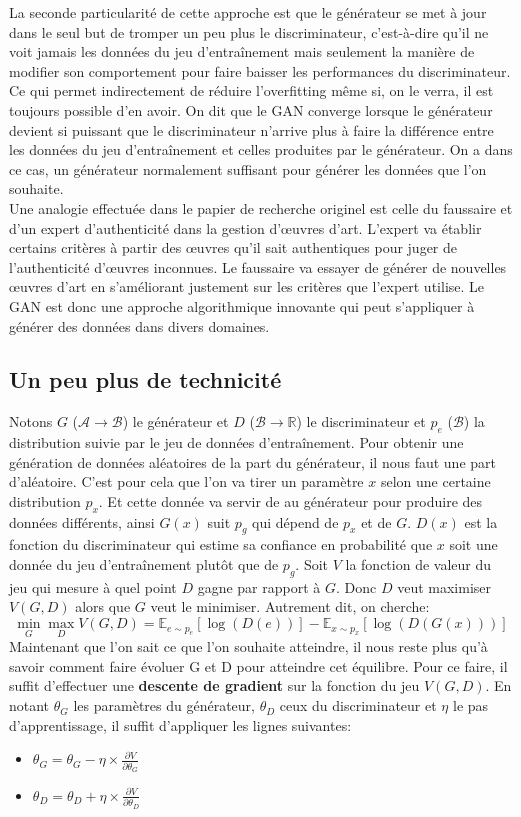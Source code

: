 \documentclass{article}
\begin{document}
La seconde particularité de cette approche est que le générateur se met à jour dans le seul but de tromper un peu
plus le discriminateur, c'est-à-dire qu'il ne voit jamais les données du jeu d'entraînement mais seulement la
manière de modifier son comportement pour faire baisser les performances du discriminateur. Ce qui permet
indirectement de réduire l'overfitting même si, on le verra, il est toujours possible d'en avoir.
On dit que le GAN converge lorsque le générateur devient si puissant que le discriminateur n'arrive plus à faire
la différence entre les données du jeu d'entraînement et celles produites par le générateur. On a dans ce cas, un
générateur normalement suffisant pour générer les données que l'on souhaite. \\

Une analogie effectuée dans le papier de recherche originel est celle du faussaire et d'un expert d'authenticité
dans la gestion d'œuvres d'art. L'expert va établir certains critères à partir des œuvres qu'il sait authentiques
pour juger de l'authenticité d'œuvres inconnues. Le faussaire va essayer de générer de nouvelles œuvres d'art en
s'améliorant justement sur les critères que l'expert utilise.
Le GAN est donc une approche algorithmique innovante qui peut s'appliquer à générer des données dans divers domaines.

\subsection{Un peu plus de technicité}
Notons $G$ ($\mathcal{A} \longrightarrow \mathcal{B}$) le générateur et $D$ ($\mathcal{B} \longrightarrow \mathbb{R}$)
le discriminateur et $p_e$ ($\mathcal{B}$) la distribution suivie par le jeu de données d'entraînement.
Pour obtenir une génération de données aléatoires de la part du générateur, il nous faut une part d'aléatoire. C'est
pour cela que l'on va tirer un paramètre $x$ selon une certaine distribution $p_x$. Et cette donnée va servir de au
générateur pour produire des données différents, ainsi $G(x)$ suit $p_g$ qui dépend de $p_x$ et de $G$.
$D(x)$ est la fonction du discriminateur qui estime sa confiance en probabilité que $x$ soit une donnée du jeu
d'entraînement plutôt que de $p_g$.
Soit $V$ la fonction de valeur du jeu qui mesure à quel point $D$ gagne par rapport à $G$. Donc $D$ veut maximiser
$V(G, D)$ alors que $G$ veut le minimiser.
Autrement dit, on cherche:
$$ \min_G \max_D V(G, D) = \mathbb{E}_{e \sim p_e}[\log(D(e))] - \mathbb{E}_{x \sim p_x} [\log(D(G(x)))] $$
Maintenant que l'on sait ce que l'on souhaite atteindre, il nous reste plus qu'à savoir comment faire évoluer G et D pour
atteindre cet équilibre.
Pour ce faire, il suffit d'effectuer une \textbf{descente de gradient} sur la fonction du jeu $V(G, D)$.
En notant $\theta_G$ les paramètres du générateur, $\theta_D$ ceux du discriminateur et $\eta$ le pas
d'apprentissage, il suffit d'appliquer les lignes suivantes:
\begin{itemize}
    \item $ \theta_G = \theta_G - \eta \times \frac{\partial V}{\partial\theta_G} $
    \item $ \theta_D = \theta_D + \eta \times \frac{\partial V}{\partial\theta_D} $
\end{itemize}
\end{document}
